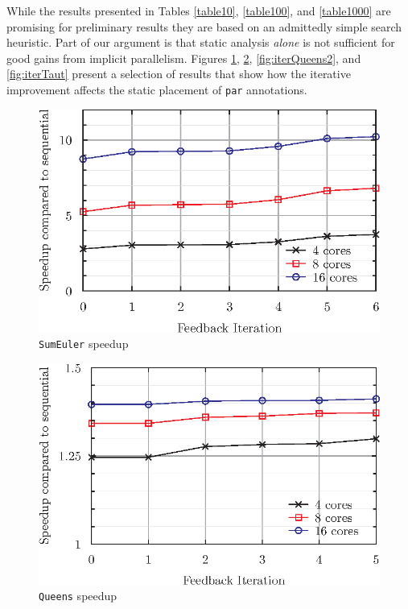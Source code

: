 While the results presented in Tables \ref{table10}, \ref{table100}, and
\ref{table1000} are promising for preliminary results they are based on an
admittedly simple search heuristic. Part of our argument is that static
analysis \emph{alone} is not sufficient for good gains from implicit
parallelism. Figures \ref{fig:iterSum}, \ref{fig:iterQueens},
\ref{fig:iterQueens2}, and \ref{fig:iterTaut} present a selection of results
that show how the iterative improvement affects the static placement of
\verb-par- annotations.

\clearpage

\begin{figure}[H]
    \includegraphics[width=\textwidth]{Informed/Figures/IterSum.eps}
    \caption{\texttt{SumEuler} speedup}
    \label{fig:iterSum}
\end{figure}
\vfill
\begin{figure}[H]
    \includegraphics[width=\textwidth]{Informed/Figures/IterQueens.eps}
    \caption{\texttt{Queens} speedup}
    \label{fig:iterQueens}
\end{figure}

